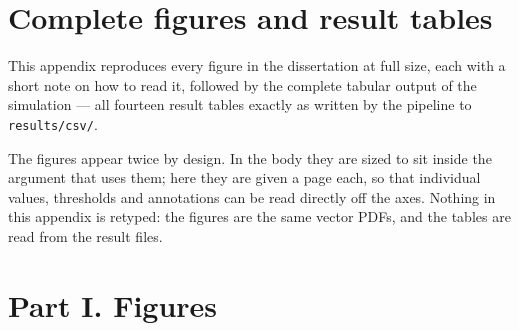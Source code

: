 \documentclass[11pt,a4paper]{article}
\newcommand{\code}[1]{\texttt{\small #1}}
\begin{document}
\clearpage
\section{Complete figures and result tables}
\label{app:compendium}

This appendix reproduces every figure in the dissertation at full size,
each with a short note on how to read it, followed by the complete
tabular output of the simulation --- all fourteen result tables exactly
as written by the pipeline to \code{results/csv/}.

The figures appear twice by design. In the body they are sized to sit
inside the argument that uses them; here they are given a page each, so
that individual values, thresholds and annotations can be read directly
off the axes. Nothing in this appendix is retyped: the figures are the
same vector PDFs, and the tables are read from the result files.




\clearpage

\section*{Part I. Figures}
\end{document}
